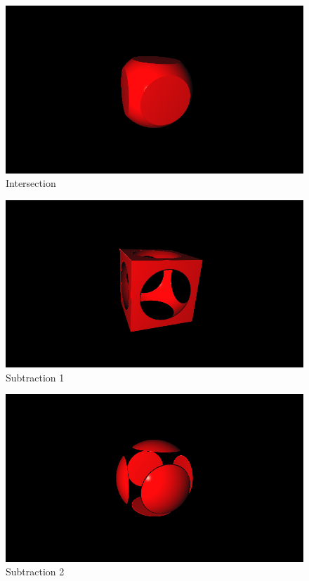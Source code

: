\begin{figure}[h!]
    \vspace{1em} %

    \begin{minipage}{0.3\textwidth}
        \centering
        \includegraphics[width=\linewidth]{imagens/sdf-operations/intersection.png}\\
        Intersection
    \end{minipage}%
    \hfill
    \begin{minipage}{0.3\textwidth}
        \centering
        \includegraphics[width=\linewidth]{imagens/sdf-operations/subtraction1.png}\\
        Subtraction 1
    \end{minipage}%
    \hfill
    \begin{minipage}{0.3\textwidth}
        \centering
        \includegraphics[width=\linewidth]{imagens/sdf-operations/subtraction2.png}\\
        Subtraction 2
    \end{minipage}


\end{figure}
